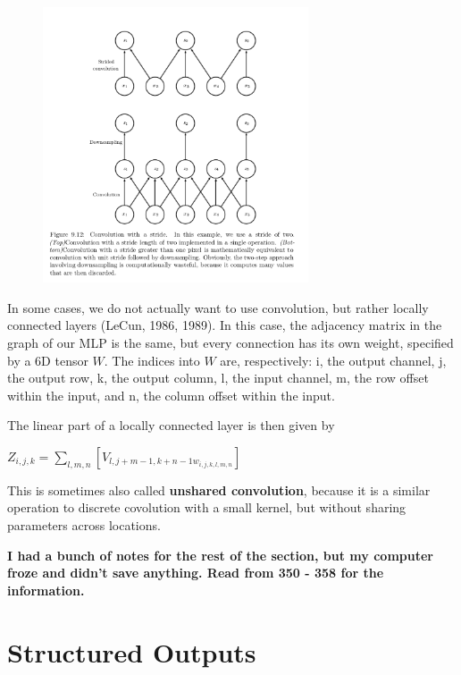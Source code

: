 \documentclass[onecolumn, letterpaper, 12pt]{report}
\begin{document}
\begin{figure}[h]
  \centering
  \includegraphics[width=0.7\textwidth]{strides.png}
\end{figure}

In some cases, we do not actually want to use convolution, but rather locally connected layers (LeCun, 1986, 1989). In this case, the adjacency matrix in the graph of our MLP is the same, but every connection has its own weight, specified by a 6D tensor $W$. The indices into $W$ are, respectively: i, the output channel, j, the output row, k, the output column, l, the input channel, m, the row offset within the input, and n, the column offset within the input. 

The linear part of a locally connected layer is then given by 

\begin{center}
  $Z_{i, j, k} = \sum\limits_{l, m, n}[V_{l,j+m-1,k+n-1w_{i,j,k,l,m,n}}]$
\end{center}

This is sometimes also called \textbf{unshared convolution}, because it is a similar operation to discrete covolution with a small kernel, but without sharing parameters across locations. 

\textbf{I had a bunch of notes for the rest of the section, but my computer froze and didn't save anything. Read from 350 - 358 for the information.}

\section{Structured Outputs}
\end{document}
